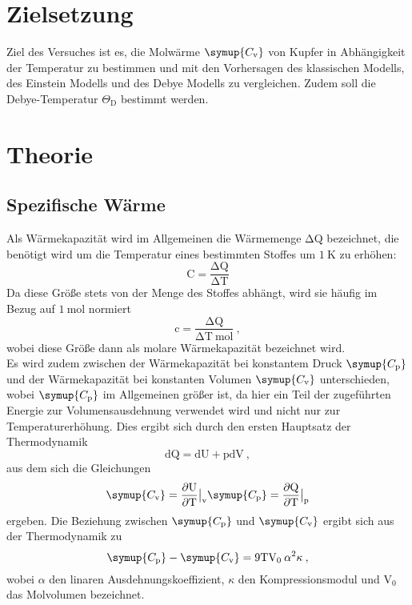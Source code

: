 \section{Zielsetzung}
Ziel des Versuches ist es, die Molwärme $\symup{C_{\text{v}}}$ von Kupfer in Abhängigkeit der
Temperatur zu bestimmen und mit den Vorhersagen des klassischen Modells, des Einstein
Modells und des Debye Modells zu vergleichen. Zudem soll die Debye-Temperatur
$\Theta_{\text{D}}$ bestimmt werden.

\section{Theorie}
\subsection{Spezifische Wärme}
Als Wärmekapazität wird im Allgemeinen die Wärmemenge $\increment \text{Q}$ bezeichnet,
die benötigt wird um
die Temperatur eines
bestimmten Stoffes um $\SI{1}{\kelvin}$ zu erhöhen:
\begin{equation}
  \text{C} = \frac{\increment \text{Q}}{\increment \text{T}}
  \label{eqn:warm}
\end{equation}
Da diese Größe stets von der Menge des Stoffes abhängt, wird sie häufig im
Bezug auf $\SI{1}{\mol}$ normiert
\begin{equation}
  \text{c} = \frac{\increment \text{Q}}{\increment \text{T} \: \text{mol}} \: ,
  \label{eqn:cmol}
\end{equation}
wobei diese Größe dann als molare Wärmekapazität bezeichnet wird.  \\
Es wird zudem zwischen der Wärmekapazität bei konstantem Druck $\symup{C_{\text{p}}}$ und der Wärmekapazität bei
konstanten Volumen $\symup{C_{\text{v}}}$ unterschieden, wobei $\symup{C_{\text{p}}}$
im Allgemeinen größer ist, da hier ein Teil der zugeführten Energie zur Volumensausdehnung verwendet
wird und nicht nur zur Temperaturerhöhung.
Dies ergibt sich durch den ersten Hauptsatz der Thermodynamik
\begin{equation}
  \text{dQ} = \text{dU} + \text{pdV} \: ,
  \label{eqn:hs1}
\end{equation}
aus dem sich die Gleichungen
\begin{equation}
  \symup{C_{\text{v}}} = \frac{\partial\text{U}}{\partial\text{T}}\bigr|_{\text{v}} \\
  \symup{C_{\text{p}}} = \frac{\partial\text{Q}}{\partial\text{T}}\bigr|_{\text{p}}
  \label{eqn:cc}
\end{equation}
ergeben. Die Beziehung zwischen $\symup{C_{\text{p}}}$ und $\symup{C_{\text{v}}}$
ergibt sich aus der Thermodynamik zu
\begin{equation}
  \symup{C_{\text{p}}}-\symup{C_{\text{v}}}=9 \text{TV}_0\:\alpha^2\kappa \: ,
  \label{eqn:cpcv}
\end{equation}
wobei $\alpha$ den linaren Ausdehnungskoeffizient, $\kappa$ den Kompressionsmodul und
$\text{V}_0$ das Molvolumen bezeichnet.

